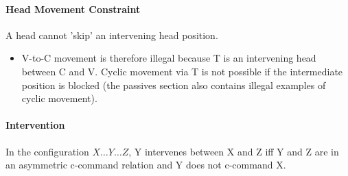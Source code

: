 \documentclass{article}
\begin{document}
\paragraph{Head Movement Constraint} A head cannot 'skip' an intervening head position.
\begin{itemize}
    \item V-to-C movement is therefore illegal because T is an intervening head between C and V. Cyclic movement via T is not possible if the intermediate position is blocked (the passives section also contains illegal examples of cyclic movement).
\end{itemize}
\paragraph{Intervention} In the configuration $X \ldots Y \ldots Z$, Y intervenes between X and Z iff Y and Z are in an asymmetric c-command relation and Y does not c-command X.
\end{document}
